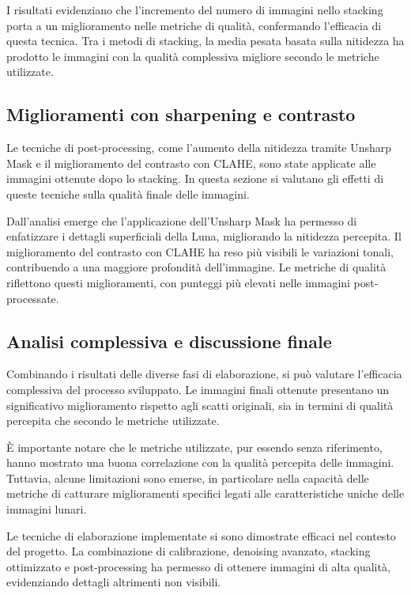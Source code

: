 I risultati evidenziano che l'incremento del numero di immagini nello stacking porta a un miglioramento nelle metriche di qualità, confermando l'efficacia di questa tecnica. Tra i metodi di stacking, la media pesata basata sulla nitidezza ha prodotto le immagini con la qualità complessiva migliore secondo le metriche utilizzate.

\subsection{Miglioramenti con sharpening e contrasto} \label{subsec:analysis_post}

Le tecniche di post-processing, come l'aumento della nitidezza tramite Unsharp Mask e il miglioramento del contrasto con CLAHE, sono state applicate alle immagini ottenute dopo lo stacking. In questa sezione si valutano gli effetti di queste tecniche sulla qualità finale delle immagini.



Dall'analisi emerge che l'applicazione dell'Unsharp Mask ha permesso di enfatizzare i dettagli superficiali della Luna, migliorando la nitidezza percepita. Il miglioramento del contrasto con CLAHE ha reso più visibili le variazioni tonali, contribuendo a una maggiore profondità dell'immagine. Le metriche di qualità riflettono questi miglioramenti, con punteggi più elevati nelle immagini post-processate.

\subsection{Analisi complessiva e discussione finale}

Combinando i risultati delle diverse fasi di elaborazione, si può valutare l'efficacia complessiva del processo sviluppato. Le immagini finali ottenute presentano un significativo miglioramento rispetto agli scatti originali, sia in termini di qualità percepita che secondo le metriche utilizzate.


È importante notare che le metriche utilizzate, pur essendo senza riferimento, hanno mostrato una buona correlazione con la qualità percepita delle immagini. Tuttavia, alcune limitazioni sono emerse, in particolare nella capacità delle metriche di catturare miglioramenti specifici legati alle caratteristiche uniche delle immagini lunari.

Le tecniche di elaborazione implementate si sono dimostrate efficaci nel contesto del progetto. La combinazione di calibrazione, denoising avanzato, stacking ottimizzato e post-processing ha permesso di ottenere immagini di alta qualità, evidenziando dettagli altrimenti non visibili.


\cleardoublepage